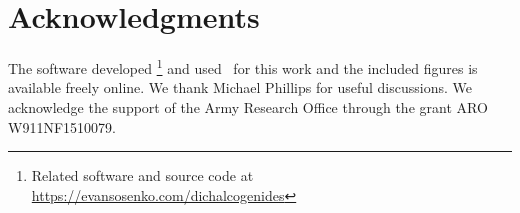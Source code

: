 \section{Acknowledgments}

The software developed %
\footnote{%
  Related software and source code at \\
  \url{https://evansosenko.com/dichalcogenides}
}
and used~\cite{Hunter:2007} for this work
and the included figures is available freely online.
We thank Michael Phillips for useful discussions.
We acknowledge the support of the Army Research Office through the grant
ARO W911NF1510079.
